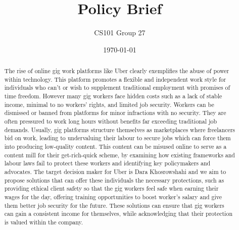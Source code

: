 \documentclass{article}
\title{Policy Brief}
\author{CS101 Group 27}
\date{\today}
\begin{document}
\maketitle

\begin{abstract}
    The rise of online gig work platforms like Uber clearly exemplifies the 
    abuse of power within technology. This platform promotes a flexible and 
    independent work style for individuals who can't or wish to supplement 
    traditional employment with promises of time freedom. However many gig 
    workers face hidden costs such as a lack of stable income, minimal to no 
    workers' rights, and limited job security. Workers can be dismissed or 
    banned from platforms for minor infractions with no security. They are 
    often pressured to work long hours without benefits far exceeding 
    traditional job demands. Usually, gig platforms structure themselves as 
    marketplaces where freelancers bid on work, leading to undervaluing their 
    labour to secure jobs which can force them into producing low-quality 
    content. This content can be misused online to serve as a content mill for 
    their get-rich-quick scheme, by examining how existing frameworks and 
    labour laws fail to protect these workers and identifying key policymakers 
    and advocates. The target decision maker for Uber is Dara Khosrowshahi and 
    we aim to propose solutions that can offer these individuals the necessary 
    protections, such as providing ethical client safety so that the gig 
    workers feel safe when earning their wages for the day, offering training 
    opportunities to boost worker's salary and give them better job security 
    for the future. These solutions can ensure that gig workers can gain a 
    consistent income for themselves, while acknowledging that their protection 
    is valued within the company.
\end{abstract}
\end{document}
